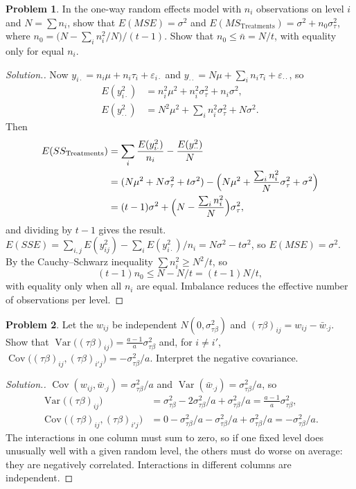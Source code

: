 \documentclass[11pt,a4paper]{article}
\numberwithin{equation}{section}
\DeclareMathOperator{\Var}{Var}
\DeclareMathOperator{\Cov}{Cov}
\theoremstyle{definition}
\newtheorem{problemx}{Problem}[subsection]
\newenvironment{problem}{\begin{problemx}}{\end{problemx}}
\newenvironment{solution}
  {\renewcommand{\qedsymbol}{}\begin{proof}[\textit{Solution}.]}
  {\end{proof}}
\begin{document}
\begin{problem}\label{prob:unbalanced}
In the one-way random effects model with $n_i$ observations on level $i$ and $N = \sum n_i$, show that $E(MSE) = \sigma^2$ and
$E(MS_{\mathrm{Treatments}}) = \sigma^2 + n_0\sigma^2_\tau$, where $n_0 = \bigl(N - \sum_in_i^2/N\bigr)/(t - 1)$. Show that $n_0 \le \bar n = N/t$, with equality only for equal $n_i$.
\end{problem}

\begin{solution}
Now $y_{i\cdot} = n_i\mu + n_i\tau_i + \varepsilon_{i\cdot}$ and $y_{\cdot\cdot} = N\mu + \sum_in_i\tau_i + \varepsilon_{\cdot\cdot}$, so
\begin{align*}
E(y_{i\cdot}^2) &= n_i^2\mu^2 + n_i^2\sigma^2_\tau + n_i\sigma^2 , \\
E(y_{\cdot\cdot}^2) &= N^2\mu^2 + \textstyle\sum_in_i^2\sigma^2_\tau + N\sigma^2 .
\end{align*}
Then
\begin{align*}
E(SS_{\mathrm{Treatments}}) &= \sum_i\frac{E(y_{i\cdot}^2)}{n_i} - \frac{E(y_{\cdot\cdot}^2)}N \\
&= (N\mu^2 + N\sigma^2_\tau + t\sigma^2) - \Bigl(N\mu^2 + \frac{\sum_in_i^2}N\sigma^2_\tau + \sigma^2\Bigr) \\
&= (t - 1)\sigma^2 + \Bigl(N - \frac{\sum_in_i^2}N\Bigr)\sigma^2_\tau ,
\end{align*}
and dividing by $t - 1$ gives the result. $E(SSE) = \sum_{i,j}E(y_{ij}^2) - \sum_iE(y_{i\cdot}^2)/n_i = N\sigma^2 - t\sigma^2$, so $E(MSE) = \sigma^2$. By the Cauchy--Schwarz inequality
$\sum n_i^2 \ge N^2/t$, so
\[
(t - 1)n_0 \le N - N/t = (t - 1)N/t ,
\]
with equality only when all $n_i$ are equal. Imbalance reduces the effective number of observations per level.
\end{solution}

\begin{problem}\label{prob:restricted-cov}
Let the $w_{ij}$ be independent $N(0, \sigma^2_{\tau\beta})$ and $(\tau\beta)_{ij} = w_{ij} - \bar w_{\cdot j}$. Show that $\Var\bigl((\tau\beta)_{ij}\bigr) = \frac{a - 1}a\sigma^2_{\tau\beta}$ and, for $i \ne i'$,
$\Cov\bigl((\tau\beta)_{ij}, (\tau\beta)_{i'j}\bigr) = -\sigma^2_{\tau\beta}/a$. Interpret the negative covariance.
\end{problem}

\begin{solution}
$\Cov(w_{ij}, \bar w_{\cdot j}) = \sigma^2_{\tau\beta}/a$ and $\Var(\bar w_{\cdot j}) = \sigma^2_{\tau\beta}/a$, so
\begin{align*}
\Var\bigl((\tau\beta)_{ij}\bigr) &= \sigma^2_{\tau\beta} - 2\sigma^2_{\tau\beta}/a + \sigma^2_{\tau\beta}/a = \tfrac{a - 1}a\sigma^2_{\tau\beta} , \\
\Cov\bigl((\tau\beta)_{ij}, (\tau\beta)_{i'j}\bigr) &= 0 - \sigma^2_{\tau\beta}/a - \sigma^2_{\tau\beta}/a + \sigma^2_{\tau\beta}/a = -\sigma^2_{\tau\beta}/a .
\end{align*}
The interactions in one column must sum to zero, so if one fixed level does unusually well with a given random level, the others must do worse on
average: they are negatively correlated. Interactions in different columns are independent.
\end{solution}
\end{document}
